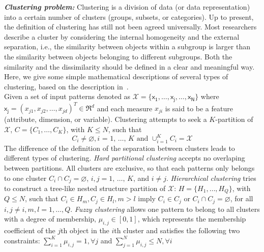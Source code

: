 \textbf{\textit{Clustering problem:}} Clustering is a division of data (or data representation) into a certain number of clusters (groups, subsets, or categories). Up to present, the definition of clustering has still not been agreed universally. Most researchers describe a cluster by considering the internal homogeneity and the external separation, i.e., the similarity between objects within a subgroup is larger than the similarity between objects belonging to different subgroups. Both the similarity and the dissimilarity should be defined in a clear and meaningful way. Here, we give some simple mathematical descriptions of several types of clustering, based on the description in~\cite{xu2005survey}.
\\Given a set of input patterns denoted as $\mathcal{X} = \{\mathsf{x_1}, \ldots, \mathsf{x_j}, \ldots, \mathsf{x_N}\}$ where $\mathsf{x_j} = (x_{j1},x_{j2}, \ldots,x_{jd})^T \in \mathfrak{R}^d$ and each measure $x_{ji}$ is said to be a feature (attribute, dimension, or variable).
Clustering attempts to seek a $K$-partition of $\mathcal{X}$, $C = \{C_{1}, \ldots, C_{K}\}$, with $K \leq N$, such that
\begin{equation}
\label{clustering_condition}
C_{i}\neq \varnothing, \textit{i = 1, \ldots, K} \mbox{  and  } \cup_{i=1}^{\textit{K}}C_{i} = \mathcal{X}
\end{equation}
The difference of the definition of the separation between clusters leads to different types of clustering.
\textit{Hard partitional clustering} accepts no overlaping between partitions. All clusters are exclusive, so that each patterns only belongs to one cluster
	$C_{i} \cap C_{j} = \varnothing$, $i,j = \textit{1, \ldots, K}$, and $i \neq j$.
\textit{Hierarchical clustering} tries to construct a tree-like nested structure partition of $\mathcal{X}$:	
	$H = \{H_{1}, \ldots, H_{Q}\}$, with $Q \leq N$, such that $C_{i} \in H_{m}, C_{j} \in H_{l}, m > l$ 	
	imply  $C_{i} \in C_{j}$ or $C_{i} \cap C_{j} = \varnothing$, for all $i,j \neq i, m, l = 1, \ldots, Q$.
\textit{Fuzzy clustering} allows one pattern to belong to all clusters with a degree of membership, $\mu_{i,j} \in [0,1]$, which represents the membership coefficient of the $j$th object in the $i$th cluster and satisfies the following two constraints:
	$\sum_{i=1}^{K} \mu_{i,j} = 1,  \forall j$ and $\sum_{j=1}^{N} \mu_{i,j} \leq N, \forall i$

